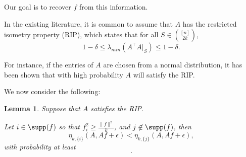 \documentclass{amsart}
\newtheorem{lemma}[thm]{Lemma}
\theoremstyle{definition}
\numberwithin{equation}{section}
\begin{document}
Our goal is to recover $f$ from this information.

In the existing literature, it is common to assume that $A$ has the restricted isometry property (RIP), which states that for all $S \in \binom{[n]}{2k}$, 
\[
    1-\delta \le \lambda_{min}(A^{\intercal}A|_S) \le 1-\delta.
\]

For instance, if the entries of $A$ are chosen from a normal distribution, it has been shown that with high probability $A$ will satisfy the RIP.

We now consider the following:
\begin{lemma}
    Suppose that $A$ satisfies the RIP.

    Let $i \in \supp(f)$ so that $f_i^2 \ge \frac{\|f\|^2}{k}$, and $j \not \in \supp(f)$, then
    \[
        \eta_{k, \{i\}}(A, Af+\epsilon) < \eta_{k, \{j\}}(A, Af+\epsilon),
    \]
    with probability at least 
    \[
            .
    \]
\end{lemma}
\end{document}

